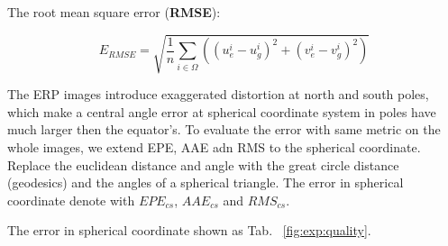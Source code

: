 The root mean square error (\textbf{RMSE}):~\cite{??}

\begin{equation}\label{equ_exp_rmse}
	E_{RMSE} = \sqrt{\frac{1}{n} \sum_{i \in \Omega}((u_e^i - u_g^i)^2 + (v_e^i - v_g^i)^2)}
\end{equation}

The ERP images introduce exaggerated distortion at north and south poles, which make a central angle error at spherical coordinate system in poles have much larger then the equator's.
To evaluate the error with same metric on the whole images, we extend EPE, AAE adn RMS to the spherical coordinate. 
Replace the euclidean distance and angle with the great circle distance (geodesics) and the angles of a spherical triangle. 
The error in spherical coordinate denote with $EPE_{cs}$, $AAE_{cs}$ and $RMS_{cs}$.

The error in spherical coordinate shown as Tab. ~\ref{fig:exp:quality}.



